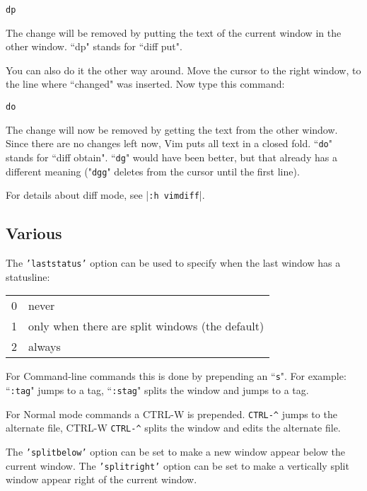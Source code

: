  \begin{Verbatim}[samepage=true]
 dp
 \end{Verbatim}

The change will be removed by putting the text of the current window in the other window.
``dp" stands for ``diff put".

You can also do it the other way around.
Move the cursor to the right window, to the line where ``changed" was inserted.
Now type this command:

 \begin{Verbatim}[samepage=true]
 do
 \end{Verbatim}

The change will now be removed by getting the text from the other window.
Since there are no changes left now, Vim puts all text in a closed fold.
``\texttt{do}" stands for ``diff obtain".
``\texttt{dg}" would have been better, but that already has a different meaning ("\texttt{dgg}" deletes from the cursor until the first line).

For details about diff mode, see |\texttt{:h vimdiff}|.
\subsection{Various}
The \texttt{'laststatus'} option can be used to specify when the last window has a statusline:

\begin{center}
				\begin{longtable}{c l}
								0 & never\\
								1 & only when there are split windows (the default)\\
								2 & always\\
				\end{longtable}
\end{center}

For Command-line commands this is done by prepending an ``\texttt{s}".
For example: ``\texttt{:tag}" jumps to a tag, ``\texttt{:stag}" splits the window and jumps to a tag.

For Normal mode commands a CTRL-W is prepended.
\texttt{CTRL-\^{}} jumps to the alternate file, CTRL-W \texttt{CTRL-\^{}} splits the window and edits the alternate file.

The \texttt{'splitbelow'} option can be set to make a new window appear below the current window.
The \texttt{'splitright'} option can be set to make a vertically split window appear right of the current window.


